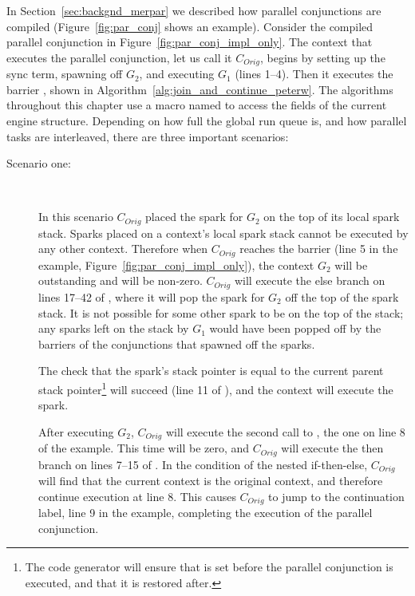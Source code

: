 In Section~\ref{sec:backgnd_merpar} we described how parallel
conjunctions are compiled
(Figure~\ref{fig:par_conj} shows an example).
Consider the compiled parallel conjunction in
Figure~\ref{fig:par_conj_impl_only}.
The context that executes the parallel conjunction,
let us call it $C_{Orig}$,
begins by
setting up the sync term,
spawning off $G_2$,
and executing $G_1$ (lines 1--4).
Then it executes the barrier \joinandcontinue,
shown in
Algorithm~\ref{alg:join_and_continue_peterw}.
The algorithms throughout this chapter use a macro named 
to access the fields of the current engine structure.
Depending on how full the global run queue is,
and how parallel tasks are interleaved,
there are three important scenarios:

\begin{description}

    \item[Scenario one:]~

    In this scenario $C_{Orig}$ placed the spark for $G_2$ on the top of its
    local spark stack.
    Sparks placed on a context's local spark stack cannot be executed by any
    other context.
    Therefore when $C_{Orig}$ reaches the \joinandcontinue barrier
    (line 5 in the example, Figure~\ref{fig:par_conj_impl_only}),
    the context $G_2$ will be outstanding and
     will be non-zero.
    $C_{Orig}$ will execute the else branch on lines 17--42 of
    \joinandcontinue,
    where it will pop the spark for $G_2$ off the top of the spark stack.
    It is not possible for some other spark to be on the top of the stack;
    any sparks left on the stack by $G_1$ would have been popped off by
    the \joinandcontinue barriers of the conjunctions that spawned off the
    sparks.

    The check that the spark's stack pointer is equal to the current
    parent stack pointer\footnote{
        The code generator will ensure that  is set
        before the parallel conjunction is executed,
        and that it is restored after.}
    will succeed (line 11 of \joinandcontinue),
    and the context will execute the spark.

    After executing $G_2$,
    $C_{Orig}$ will execute the second call to \joinandcontinue,
    the one on line 8 of the example.
    This time  will be zero,
    and $C_{Orig}$ will execute the then branch on lines 7--15 of
    \joinandcontinue.
    In the condition of the nested if-then-else,
    $C_{Orig}$ will find that the current context is the original context,
    and therefore continue execution at line 8.
    This causes $C_{Orig}$ to jump to the continuation label,
    line 9 in the example,
    completing the execution of the parallel conjunction.


\end{description}
